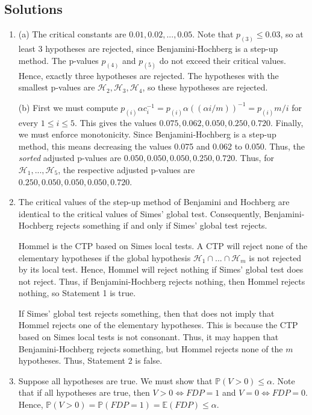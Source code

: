 \documentclass[11pt]{article}
\theoremstyle{plain}
\theoremstyle{definition}
\newcommand{\Hy}{\mathcal{H}}
\newcommand{\pr}{\mathbb{P}}
\begin{document}
\begin{sols}
\subsection{Solutions}
\begin{enumerate}

\item 

(a) The critical constants are $0.01, 0.02,...,0.05$. Note that $p_{(3)}\leq 0.03$, so at least 3 hypotheses are rejected, since Benjamini-Hochberg is a step-up method. The p-values $p_{(4)}$ and $p_{(5)}$ do not exceed their critical values. Hence, exactly three hypotheses are rejected. The hypotheses with the smallest p-values are $\Hy_2, \Hy_3, \Hy_4$, so these hypotheses are rejected.

(b) First we must compute $p_{(i)}\alpha c_i^{-1} =p_{(i)}\alpha ((\alpha i/m))^{-1} = p_{(i)}m/i$ for every $1\leq i \leq 5$. This gives the values $0.075,  0.062, 0.050, 0.250, 0.720$. Finally, we must enforce monotonicity. 
Since Benjamini-Hochberg is a step-up method, this means decreasing the values 0.075 and 0.062 to 0.050. Thus, the \emph{sorted} adjusted p-values are 
 $0.050,  0.050, 0.050, 0.250, 0.720$. Thus, for $\Hy_1,...,\Hy_5$, the respective adjusted p-values are $0.250, 0.050,  0.050, 0.050,  0.720$.
 


\item The critical values of the step-up method of Benjamini and Hochberg are identical to the critical values of Simes' global test. 
Consequently, Benjamini-Hochberg rejects something if and only if Simes' global test rejects.

Hommel is the CTP based on Simes local tests. A CTP will reject none of the  elementary hypotheses if the global hypothesis $\Hy_1\cap...\cap \Hy_m$ is not rejected by its local test. Hence,  Hommel will reject nothing if Simes' global test does not reject.
Thus, if Benjamini-Hochberg rejects nothing, then Hommel rejects nothing, so Statement 1 is true. 

If Simes' global test rejects something, then that does not imply that Hommel rejects one of the elementary hypotheses. This is because the CTP based on Simes local tests is not consonant. Thus, it may happen that Benjamini-Hochberg rejects something, but Hommel rejects none of the $m$ hypotheses. Thus, Statement 2 is false.

\item Suppose all hypotheses are true. We must show that $\pr(V>0)\leq \alpha$. Note that if all hypotheses are true, then $V>0\Leftrightarrow FDP=1$ and $V=0\Leftrightarrow FDP=0$.
Hence, 
 $\pr(V>0) =\pr(FDP=1) = \mathbb{E}(FDP)\leq\alpha$.



\end{enumerate}
\end{sols}
\end{document}
